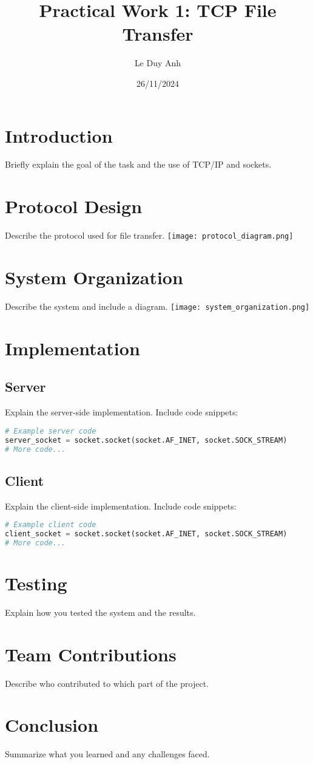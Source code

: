 \documentclass{article}
\title{Practical Work 1: TCP File Transfer}
\author{Le Duy Anh}
\date{26/11/2024}
\begin{document}
\maketitle

\section{Introduction}
Briefly explain the goal of the task and the use of TCP/IP and sockets.

\section{Protocol Design}
Describe the protocol used for file transfer.
\texttt{[image: protocol\_diagram.png]}

\section{System Organization}
Describe the system and include a diagram.
\texttt{[image: system\_organization.png]}

\section{Implementation}
\subsection{Server}
Explain the server-side implementation. Include code snippets:
\begin{lstlisting}[language=Python]
# Example server code
server_socket = socket.socket(socket.AF_INET, socket.SOCK_STREAM)
# More code...
\end{lstlisting}

\subsection{Client}
Explain the client-side implementation. Include code snippets:
\begin{lstlisting}[language=Python]
# Example client code
client_socket = socket.socket(socket.AF_INET, socket.SOCK_STREAM)
# More code...
\end{lstlisting}

\section{Testing}
Explain how you tested the system and the results.

\section{Team Contributions}
Describe who contributed to which part of the project.

\section{Conclusion}
Summarize what you learned and any challenges faced.
\end{document}
